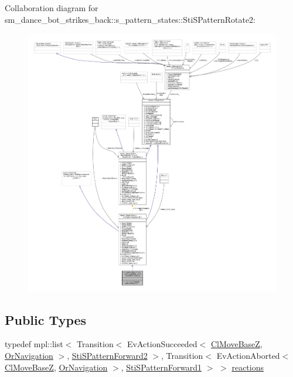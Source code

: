 Collaboration diagram for sm\+\_\+dance\+\_\+bot\+\_\+strikes\+\_\+back\+:\+:s\+\_\+pattern\+\_\+states\+:\+:Sti\+S\+Pattern\+Rotate2\+:
\nopagebreak
\begin{figure}[H]
\begin{center}
\leavevmode
\includegraphics[width=350pt]{structsm__dance__bot__strikes__back_1_1s__pattern__states_1_1StiSPatternRotate2__coll__graph}
\end{center}
\end{figure}
\subsection*{Public Types}
\begin{DoxyCompactItemize}
\item 
typedef mpl\+::list$<$ Transition$<$ Ev\+Action\+Succeeded$<$ \hyperlink{classmove__base__z__client_1_1ClMoveBaseZ}{Cl\+Move\+BaseZ}, \hyperlink{classsm__dance__bot__strikes__back_1_1OrNavigation}{Or\+Navigation} $>$, \hyperlink{structsm__dance__bot__strikes__back_1_1s__pattern__states_1_1StiSPatternForward2}{Sti\+S\+Pattern\+Forward2} $>$, Transition$<$ Ev\+Action\+Aborted$<$ \hyperlink{classmove__base__z__client_1_1ClMoveBaseZ}{Cl\+Move\+BaseZ}, \hyperlink{classsm__dance__bot__strikes__back_1_1OrNavigation}{Or\+Navigation} $>$, \hyperlink{structsm__dance__bot__strikes__back_1_1s__pattern__states_1_1StiSPatternForward1}{Sti\+S\+Pattern\+Forward1} $>$ $>$ \hyperlink{structsm__dance__bot__strikes__back_1_1s__pattern__states_1_1StiSPatternRotate2_a78da9524dc7c70a846265f1fae9a2336}{reactions}
\end{DoxyCompactItemize}
